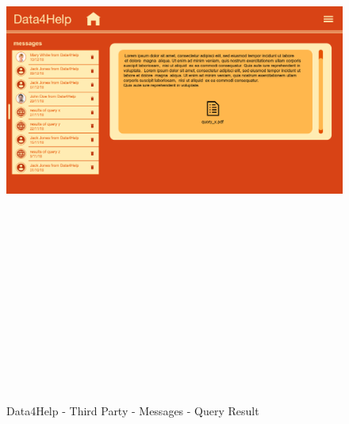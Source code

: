 \begin{figure}[H]
    \includegraphics[width=.6\linewidth, height = 20cm, keepaspectratio]{./Images/Mockups/Data4Help/D4HTP/D4HTP_ShowQuery.png}
    \centering
    \caption{Data4Help - Third Party - Messages - Query Result}
    \label{fig:sab}
  \end{figure}


